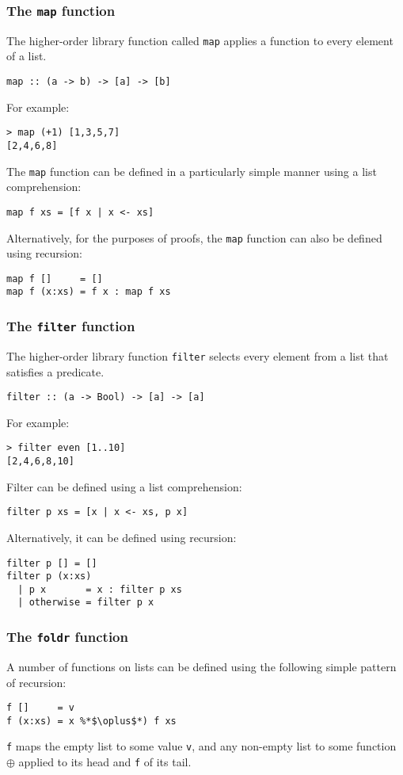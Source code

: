 \begin{multicols}{2}
\subsubsection{The \lstinline{map} function}
The higher-order library function called \lstinline{map} applies a function to every element of a list.
\begin{lstlisting}
map :: (a -> b) -> [a] -> [b]
\end{lstlisting}
For example:
\begin{lstlisting}
> map (+1) [1,3,5,7]
[2,4,6,8]
\end{lstlisting}

The \lstinline{map} function can be defined in a particularly simple manner using a list comprehension:
\begin{lstlisting}
map f xs = [f x | x <- xs]
\end{lstlisting}

Alternatively, for the purposes of proofs, the \lstinline{map} function can also be defined using recursion:
\begin{lstlisting}
map f []     = []
map f (x:xs) = f x : map f xs
\end{lstlisting} 

\subsubsection{The \lstinline{filter} function}
The higher-order library function \lstinline{filter} selects every element from a list that satisfies a predicate.
\begin{lstlisting}
filter :: (a -> Bool) -> [a] -> [a]
\end{lstlisting}
For example:
\begin{lstlisting}
> filter even [1..10]
[2,4,6,8,10]
\end{lstlisting}

Filter can be defined using a list comprehension:
\begin{lstlisting}
filter p xs = [x | x <- xs, p x]
\end{lstlisting}

Alternatively, it can be defined using recursion:
\begin{lstlisting}
filter p [] = []
filter p (x:xs)
  | p x       = x : filter p xs
  | otherwise = filter p x
\end{lstlisting}

\subsubsection{The \lstinline{foldr} function}
A number of functions on lists can be defined using the following simple pattern of recursion:
\begin{lstlisting}
f []     = v
f (x:xs) = x %*$\oplus$*) f xs
\end{lstlisting}
\lstinline{f} maps the empty list to some value \lstinline{v}, and any non-empty list to some function \(\oplus\) applied to its head and \lstinline{f} of its tail.


\end{multicols}
